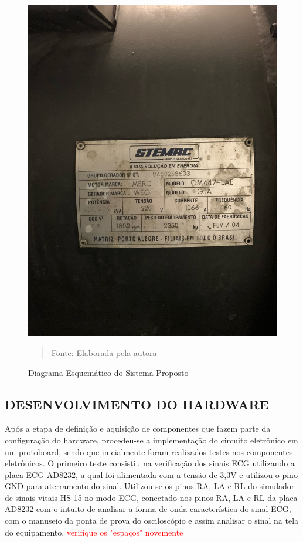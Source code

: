 \begin{figure}[H]
\begin{center}
			\caption{Diagrama Esquemático do Sistema Proposto}
			\includegraphics[width=.8\textwidth]{Figuras/info_gerador_450.jpeg}
            \vspace*{\fill} 
            \begin{quote} 
            \centering 
           Fonte: {Elaborada pela autora}
            \end{quote}
            \vspace*{\fill}
			\label{fig:dia}

\end{center}
\end{figure}



\subsection{DESENVOLVIMENTO DO HARDWARE}
\hspace*{0.8cm}Após a etapa de definição e aquisição de componentes que fazem parte da configuração do hardware, procedeu-se a implementação do circuito eletrônico em um protoboard, sendo que inicialmente foram realizados testes nos componentes eletrônicos. O primeiro teste consistiu na verificação dos sinais ECG utilizando a placa ECG AD8232, a qual foi alimentada com a tensão de 3,3V e utilizou o  pino GND para aterramento do sinal. Utilizou-se os pinos RA, LA e RL do simulador de sinais vitais HS-15 no modo ECG, conectado nos pinos RA, LA e RL da placa AD8232 com o intuito de analisar a forma de onda característica do sinal ECG, com o manuseio da ponta de prova do osciloscópio e assim analisar o sinal na tela do equipamento. \textcolor{red}{verifique os "espaços" novemente}